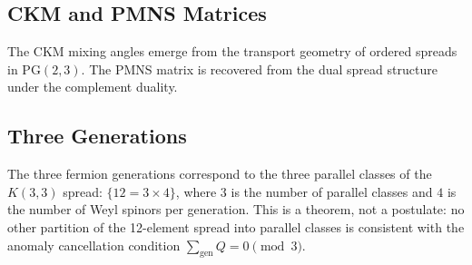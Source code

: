 \subsection{CKM and PMNS Matrices}

The CKM mixing angles emerge from the transport geometry of ordered
spreads in $\mathrm{PG}(2,3)$. The PMNS matrix is recovered from the
dual spread structure under the complement duality.

\subsection{Three Generations}

The three fermion generations correspond to the three parallel classes
of the $K(3,3)$ spread:
$\{12 = 3 \times 4\}$, where $3$ is the number of parallel classes
and $4$ is the number of Weyl spinors per generation.
This is a theorem, not a postulate: no other partition of the 12-element
spread into parallel classes is consistent with the anomaly cancellation
condition $\sum_{\text{gen}} Q = 0 \pmod{3}$.
